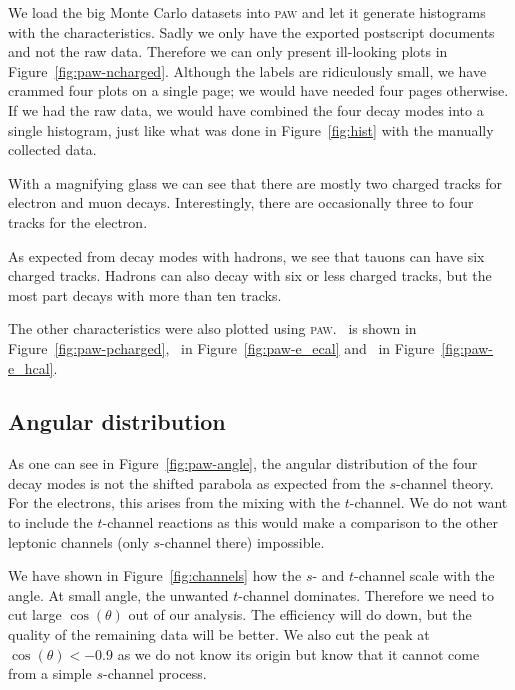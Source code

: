 \documentclass[11pt, english, fleqn, DIV=15, headinclude, BCOR=2cm]{scrreprt}
\begin{document}
We load the big Monte Carlo datasets into \textsc{paw} and let it generate
histograms with the characteristics. Sadly we only have the exported postscript
documents and not the raw data. Therefore we can only present ill-looking plots
in Figure~\ref{fig:paw-ncharged}. Although the labels are ridiculously small,
we have crammed four plots on a single page; we would have needed four pages
otherwise. If we had the raw data, we would have combined the four decay modes
into a single histogram, just like what was done in Figure~\ref{fig:hist} with
the manually collected data.



With a magnifying glass we can see that there are mostly two charged tracks for
electron and muon decays. Interestingly, there are occasionally three to four
tracks for the electron.

As expected from decay modes with hadrons, we see that tauons can have six
charged tracks. Hadrons can also decay with six or less charged tracks, but the
most part decays with more than ten tracks.

The other characteristics were also plotted using \textsc{paw}. \pcharged\ is
shown in Figure~\ref{fig:paw-pcharged}, \eecal\ in Figure~\ref{fig:paw-e_ecal}
and \ehcal\ in Figure~\ref{fig:paw-e_hcal}.

\subsection{Angular distribution}

As one can see in Figure~\ref{fig:paw-angle}, the angular distribution of the
four decay modes is not the shifted parabola as expected from the $s$-channel
theory. For the electrons, this arises from the mixing with the $t$-channel. We
do not want to include the $t$-channel reactions as this would make a
comparison to the other leptonic channels (only $s$-channel there) impossible.

We have shown in Figure~\ref{fig:channels} how the $s$- and $t$-channel scale
with the angle. At small angle, the unwanted $t$-channel dominates. Therefore
we need to cut large $\cos(\theta)$ out of our analysis. The efficiency will do
down, but the quality of the remaining data will be better. We also cut the
peak at $\cos(\theta) < -0.9$ as we do not know its origin but know that it
cannot come from a simple $s$-channel process.


\end{document}
